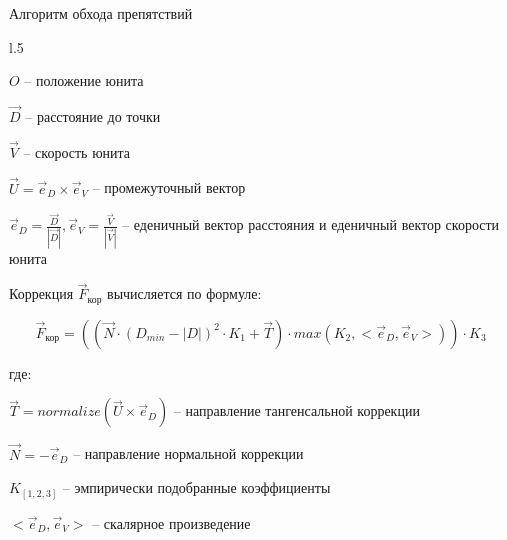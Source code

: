 \begin{tslide}{Алгоритм обхода препятствий}
\begin{wrapfigure}{l}{.5\linewidth}
    \vspace{-2cm}
    \end{wrapfigure}

$O$ -- положение юнита

$\vec D$ -- расстояние до точки

$\vec V$ -- скорость юнита

$\vec U = \vec e_D \times \vec e_V$ -- промежуточный вектор

$\vec e_D = \frac{\vec D}{|\vec D|}, \vec e_V = \frac{\vec V}{|\vec V|}$ -- еденичный вектор расстояния и еденичный вектор скорости юнита

Коррекция $\vec F_{\text{кор}}$ вычисляется по формуле:

$$\vec F_{\text{кор}} = ( ( \vec N \cdot ( D_{min} - |D| )^2 \cdot K_1 + \vec T ) \cdot max( K_2, < \vec e_D, \vec e_V > ) ) \cdot K_3 $$

где:

$\vec T = normalize(\vec U \times \vec e_D)$ -- направление тангенсальной коррекции

$\vec N = -\vec e_D$ -- направление нормальной коррекции

$K_{[1,2,3]}$ -- эмпирически подобранные коэффициенты

$< \vec e_D, \vec e_V >$ -- скалярное произведение

\end{tslide}

